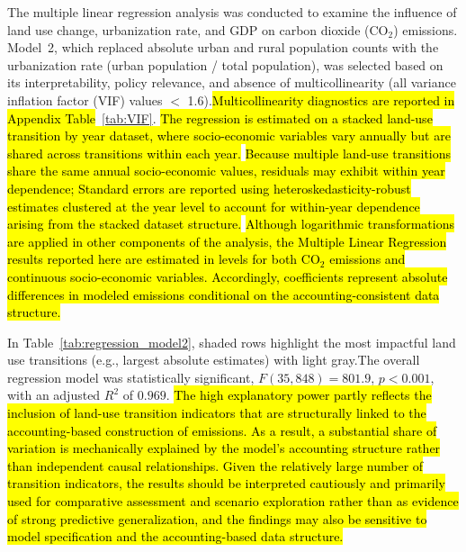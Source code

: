 \documentclass[10pt,letterpaper]{article}
\begin{document}
The multiple linear regression analysis was conducted to examine the influence of land use change, urbanization rate, and GDP on carbon dioxide (CO$_2$) emissions. Model~2, which replaced absolute urban and rural population counts with the urbanization rate (urban population / total population), was selected based on its interpretability, policy relevance, and absence of multicollinearity (all variance inflation factor (VIF) values $<$ 1.6).\hl{Multicollinearity diagnostics are reported in Appendix Table}~\ref{tab:VIF}. \hl{The regression is estimated on a stacked land-use transition by year dataset, where socio-economic variables vary annually but are shared across transitions within each year.} \hl{Because multiple land-use transitions share the same annual socio-economic values, residuals may exhibit within year dependence; Standard errors are reported using heteroskedasticity-robust estimates clustered at the year level to account for within-year dependence arising from the stacked dataset structure.}
\hl{Although logarithmic transformations are applied in other components of the analysis, the Multiple Linear Regression results reported here are estimated in levels for both CO$_2$ emissions and continuous socio-economic variables. Accordingly, coefficients represent absolute differences in modeled emissions conditional on the accounting-consistent data structure.}

In Table~\ref{tab:regression_model2}, shaded rows highlight the most impactful land use transitions (e.g., largest absolute estimates) with light gray.The overall regression model was statistically significant, $F (35, 848) = 801.9$, $p < 0.001$, with an adjusted $R^2$ of $0.969$. \hl{The high explanatory power partly reflects the inclusion of land-use transition indicators that are structurally linked to the accounting-based construction of emissions. As a result, a substantial share of variation is mechanically explained by the model’s accounting structure rather than independent causal relationships. Given the relatively large number of transition indicators, the results should be interpreted cautiously and primarily used for comparative assessment and scenario exploration rather than as evidence of strong predictive generalization, and the findings may also be sensitive to model specification and the accounting-based data structure.}

 
\end{document}
